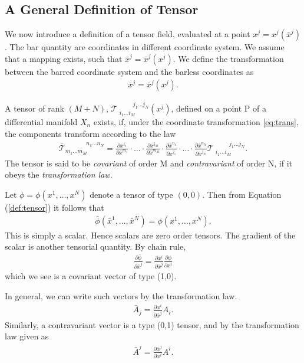 \documentclass[main.tex]{subfiles}
\begin{document}

\subsection{A General Definition of Tensor}
We now introduce a definition of a tensor field, evaluated at a point $x^j = x^j(\bar{x}^j)$. 
The bar quantity are coordinates in different coordinate system. We assume that a mapping exists, 
such that $\bar{x}^j = \bar{x}^j(x^j)$. We define the transformation between the barred 
coordinate system and the barless coordinates as
\begin{align}
\label{eq:trans}
\bar{x}^j = \bar{x}^j(x^j).
\end{align}

\begin{mydef}
A tensor of rank $(M+N)$,
$\mathcal{T}^{\phantom{i_1 \hdots i_M}j_1 \hdots j_N}_{\,\,i_1 \hdots i_M}(x^j)$, defined on a point P of 
a differential manifold $X_n$ exists, if, under the coordinate transformation \eqref{eq:trans}, 
the components transform according to the law
\begin{align} \label{def:tensor}
\overline{\mathcal{T}}^{\phantom{m_1 \hdots m_N}n_1 \hdots n_N}_{m_1 \hdots m_M} = 
\frac{\partial x^{i_1}}{\partial \bar{x}^{m_1}} \cdot \hdots \cdot 
\frac{\partial x^{i_M}}{\partial \bar{x}^{m_M}} \cdot
\frac{\partial \bar{x}^{n_1}}{\partial x^{j_1}}  \cdot \hdots \cdot 
\frac{\partial \bar{x}^{n_N}}{\partial x^{j_N}}
\mathcal{T}^{\phantom{i_1 \hdots i_M}j_1 \hdots j_N}_{\,\,i_1 \hdots i_M}.
\end{align}
The tensor is said to be \emph{covariant} of order M and \emph{contravariant} of order N, 
if it obeys the \emph{transformation law}.
\end{mydef}

\begin{example}
Let $\phi = \phi(x^1,\hdots,x^N)$ denote a tensor of type $(0,0)$. Then from 
Equation (\ref{def:tensor}) it follows that
\begin{align*}
\bar{\phi}(\bar{x}^1,\hdots,\bar{x}^N) = \phi(x^1,\hdots,x^N).
\end{align*}
This is simply a scalar. Hence scalars are zero order tensors. The gradient of the scalar 
is another tensorial quantity. By chain rule, 
\begin{align*}
\frac{\partial \bar{\phi}}{\partial\bar{x}^j} = \frac{\partial x^i}{\partial \bar{x}^j}
          															  \frac{\partial\phi}{\partial x^i}									
\end{align*}
which we see is a covariant vector of type (1,0). 
\end{example} 
In general, we can write such vectors by the transformation law.
\begin{align*}
\bar{A}_j = \frac{\partial x^i}{\partial \bar{x}^j} A_i.
\end{align*}
Similarly, a contravariant vector is a type (0,1) tensor, and by the transformation law
given as
\begin{align*}
\bar{A}^j = \frac{\partial \bar{x}^j}{\partial x^i} A^i.
\end{align*}
\end{document}
